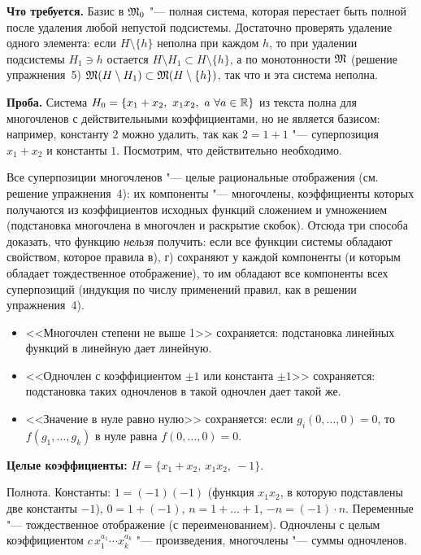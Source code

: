 \begin{solution}[7 (\S\,4)]
\textbf{Что требуется.} Базис в $\mathfrak M_0$ "--- полная система, которая
перестает быть полной после удаления любой непустой подсистемы. Достаточно
проверять удаление одного элемента: если $H\setminus\{h\}$ неполна при каждом
$h$, то при удалении подсистемы $H_1\ni h$ остается
$H\setminus H_1\subset H\setminus\{h\}$, а по монотонности $\mathfrak M$ (решение
упражнения~5) $\mathfrak M(H\setminus H_1)\subset\mathfrak M(H\setminus\{h\})$, так что и эта
система неполна.

\textbf{Проба.} Система $H_0=\{x_1+x_2,\ x_1x_2,\ a\ \forall a\in\mathbb R\}$ из
текста полна для многочленов с действительными коэффициентами, но не
является базисом: например, константу $2$ можно удалить, так как
$2=1+1$ "--- суперпозиция $x_1+x_2$ и константы $1$. Посмотрим, что
действительно необходимо.

Все суперпозиции многочленов "--- целые рациональные отображения (см.
решение упражнения~4): их компоненты "--- многочлены, коэффициенты которых
получаются из коэффициентов исходных функций сложением и умножением
(подстановка многочлена в многочлен и раскрытие скобок). Отсюда три способа
доказать, что функцию \emph{нельзя} получить: если все функции системы
обладают свойством, которое правила в), г) сохраняют у каждой компоненты
(и которым обладает тождественное отображение), то им обладают все
компоненты всех суперпозиций (индукция по числу применений правил, как
в решении упражнения~4).
\begin{itemize}[leftmargin=1.4em,itemsep=1pt]
\item[(а)] <<Многочлен степени не выше 1>> сохраняется: подстановка линейных
  функций в линейную дает линейную.
\item[(б)] <<Одночлен с коэффициентом $\pm1$ или константа $\pm1$>>
  сохраняется: подстановка таких одночленов в такой одночлен дает такой же.
\item[(в)] <<Значение в нуле равно нулю>> сохраняется:
  если $g_i(0,\dots,0)=0$, то $f(g_1,\dots,g_k)$ в нуле равна $f(0,\dots,0)=0$.
\end{itemize}

\textbf{Целые коэффициенты:} $H=\{x_1+x_2,\ x_1x_2,\ -1\}$.

Полнота. Константы: $1=(-1)(-1)$ (функция $x_1x_2$, в которую подставлены
две константы $-1$), $0=1+(-1)$, $n=1+\dots+1$, $-n=(-1)\cdot n$. Переменные
"--- тождественное отображение (с переименованием). Одночлены с целым
коэффициентом $c\,x_1^{a_1}\cdots x_k^{a_k}$ "--- произведения, многочлены "---
суммы одночленов.


\end{solution}
